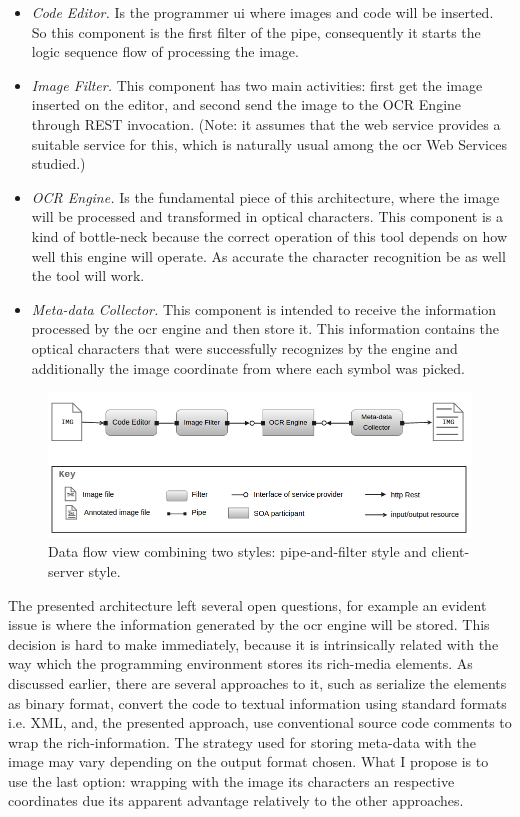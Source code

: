 \begin{itemize}
\item \textit{Code Editor.} Is the programmer \gls{ui} where images and code will be inserted. So this component is the first filter of the pipe, consequently it starts the logic sequence flow of processing the image.
\item \textit{Image Filter.} This component has two main activities: first get the image inserted on the editor, and second send the image to the OCR Engine through REST invocation. (Note: it assumes that the web service provides a suitable service for this, which is naturally usual among the \gls{ocr} Web Services studied.)
\item \textit{OCR Engine.} Is the fundamental piece of this architecture, where the image will be processed and transformed in optical characters. This component is a kind of bottle-neck because the correct operation of this tool depends on how well this engine will operate. As accurate the character recognition be as well the tool will work.
\item \textit{Meta-data Collector.} This component is intended to receive the information processed by the \gls{ocr} engine and then store it. This information contains the optical characters that were successfully recognizes by the engine and additionally the image coordinate from where each symbol was picked. 
\end{itemize}

\begin{figure}[!htbp]
  \centering
  \includegraphics[width=.7\textwidth]{images/sc-tool-architecture}
    \caption{Data flow view combining two styles: pipe-and-filter style and client-server style.}
  \label{fig:sc-tool-arch}
\end{figure}

The presented architecture left several open questions, for example an evident issue is where the information generated by the \gls{ocr} engine will be stored. This decision is hard to make immediately, because it is intrinsically related with the way which the programming environment stores its rich-media elements. As discussed earlier, there are several approaches to it, such as serialize the elements as binary format, convert the code to textual information using standard formats i.e. XML, and, the presented approach, use conventional source code comments to wrap the rich-information. The strategy used for storing meta-data with the image may vary depending on the output format chosen. What I propose is to use the last option: wrapping with the image its characters an respective coordinates due its apparent advantage relatively to the other approaches.


